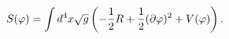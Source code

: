 \begin{equation}\label{fullaction}
S(\varphi)= \int d^4x
\sqrt{g}\left(-{1\over 2}R+{1\over 2} (\partial \varphi)^2 +V(\varphi)\right).
\end{equation}

